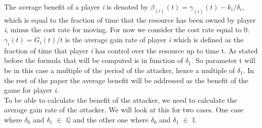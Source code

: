 The average benefit of a player \textit{i} is denoted by $\beta_(i)(t) = \gamma_(i)(t) - k_{i} / \delta_{i}$, which is equal to the fraction of time that the resource has been owned by player \textit{i}, minus the cost rate for moving. For now we consider the cost rate equal to 0. $\gamma_{i}(t) = G_{i}(t)/t$ is the average gain rate of player \textit{i} which is defined as the fraction of time that player \textit{i} has control over the resource up to time t.
As stated before the formula that will be computed is in function of $\delta_{1}$. So parameter t will be in this case a multiple of the period of the attacker, hence a multiple of $\delta_{1}$. In the rest of the paper the average benefit will be addressed as the benefit of the game for player \textit{i}. \\

To be able to calculate the benefit of the attacker, we need to calculate the average gain rate of the attacker. We will look at this for two cases. One case where $\delta_{0}$ and $\delta_{1}$ $\in$ \(\mathbb{Q}\) and the other one where $\delta_{0}$ and $\delta_{1}$ $\in$ \(\mathbb{I}.\) \\

